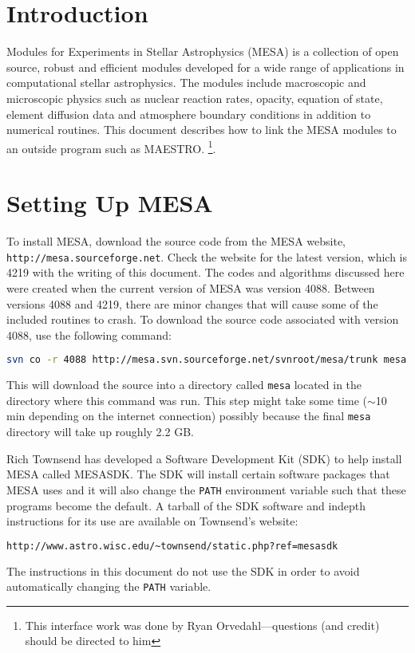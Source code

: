 
\section{Introduction}

Modules for Experiments in Stellar Astrophysics ({\sf MESA}) is a collection 
of open source, robust and efficient modules developed for a wide range of 
applications in computational stellar astrophysics. The modules include 
macroscopic and microscopic physics such as nuclear reaction rates, opacity, 
equation of state, element diffusion data and atmosphere boundary conditions 
in addition to numerical routines. This document describes how to link the 
{\sf MESA} modules to an outside program such as {\sf MAESTRO}.
\footnote{This
  interface work was done by Ryan Orvedahl---questions (and credit)
  should be directed to him}.



\section{Setting Up {\sf MESA}}

To install {\sf MESA}, download the source code from the {\sf MESA} website, 
{\tt http://mesa.sourceforge.net}. Check the website for the latest version, 
which is 4219 with the writing of this document. The codes and algorithms 
discussed here were created when the current version of {\sf MESA} was 
version 4088. Between versions 4088 and 4219, there are minor changes that 
will cause some of the included routines to crash. To download the source code 
associated with version 4088, use the following command:
\begin{lstlisting}[language=bash,mathescape=false]
  svn co -r 4088 http://mesa.svn.sourceforge.net/svnroot/mesa/trunk mesa
\end{lstlisting}
This will download the source into a directory called {\tt mesa} located 
in the directory where this command was run. This step might take some time 
($\sim$10 min depending on the internet connection) possibly because the 
final {\tt mesa} directory will take up roughly 2.2 GB.

Rich Townsend has developed a Software Development Kit (SDK) to help install 
{\sf MESA} called {\sf MESASDK}. The SDK will install certain software 
packages that {\sf MESA} uses and it will also change the {\tt PATH} 
environment variable such that these programs become the default. A tarball 
of the SDK software and indepth instructions for its use are available on 
Townsend's website:
\begin{lstlisting}[language=html,mathescape=false]
  http://www.astro.wisc.edu/~townsend/static.php?ref=mesasdk
\end{lstlisting}
The instructions in this document do not use the SDK in order to avoid 
automatically changing the {\tt PATH} variable.

